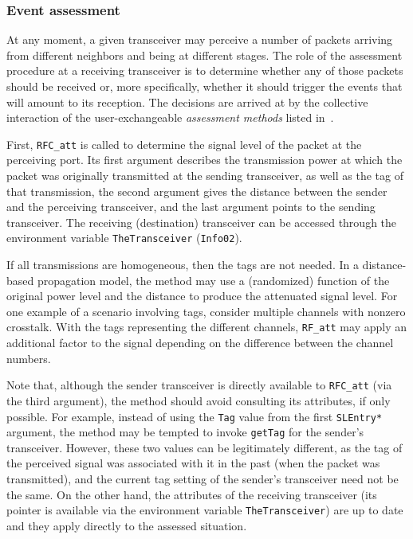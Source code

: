 \subsubsection{Event assessment}
\label{rm_tr_ra_ea}

At any moment, a given transceiver may perceive a number of packets arriving
from different neighbors and being at different stages.
The role of the assessment procedure at a receiving transceiver is to
determine whether any of those packets should be received or, more
specifically, whether it should trigger the events that will
amount to its reception.
The decisions are arrived at by the collective interaction of the
user-exchangeable {\em assessment methods\/} listed in~.

First, {\tt RFC\_att} is called to
determine the signal level of the packet at the
perceiving port.
Its first argument describes the transmission power at which
the packet was originally transmitted at the sending transceiver,
as well as the tag of that transmission,
the second argument gives the distance between
the sender and the perceiving transceiver, and the last argument
points to the sending transceiver.
The receiving (destination) transceiver can be accessed through the
environment variable {\tt TheTransceiver} ({\tt Info02}).

If all transmissions are homogeneous, then the tags are not needed.
In a distance-based propagation model, the method may use a (randomized)
function of the original power level and the distance to produce the
attenuated signal level.
For one example of a scenario involving tags, consider multiple channels
with nonzero crosstalk.
With the tags representing the different channels, {\tt RF\_att} may apply an
additional factor to the signal depending on the difference
between the channel numbers.

Note that, although the sender transceiver is directly available
to {\tt RFC\_att} (via the third argument), the method
should avoid consulting its attributes, if only possible.
For example, instead of using the {\tt Tag} value from the
first {\tt SLEntry*} argument, the method may be tempted to invoke
{\tt getTag} for the sender's transceiver.
However,
these two values can be legitimately different, as the tag of the perceived
signal was associated with it in the past (when the packet was transmitted),
and the current tag setting of the sender's transceiver need not be the same.
On the other hand, the attributes of the receiving transceiver 
(its pointer is available via the environment variable
{\tt TheTransceiver}) are up to date
and they apply directly to the assessed situation.

